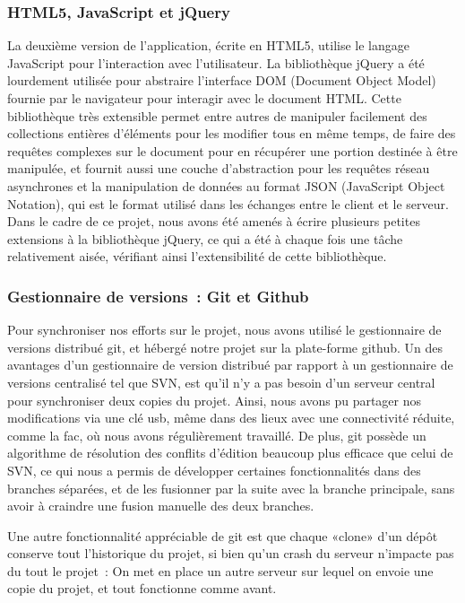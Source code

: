\documentclass[a4paper,11pt,french]{article}
\begin{document}
\subsubsection{HTML5, JavaScript et jQuery}

La deuxième version de l'application, écrite en HTML5, utilise le langage JavaScript pour l'interaction avec l'utilisateur. La bibliothèque jQuery a été lourdement utilisée pour abstraire l'interface DOM (Document Object Model) fournie par le navigateur pour interagir avec le document HTML. Cette bibliothèque très extensible permet entre autres de manipuler facilement des collections entières d'éléments pour les modifier tous en même temps, de faire des requêtes complexes sur le document pour en récupérer une portion destinée à être manipulée, et
fournit aussi une couche d'abstraction pour les requêtes réseau asynchrones et la manipulation de données au format JSON (JavaScript Object Notation), qui est le format utilisé dans les échanges entre le client et le serveur. Dans le cadre de ce projet, nous avons été amenés à écrire plusieurs petites extensions à la bibliothèque jQuery, ce qui a été à chaque fois une tâche relativement aisée, vérifiant ainsi l'extensibilité de cette bibliothèque.

\subsubsection{Gestionnaire de versions~: Git et Github}

Pour synchroniser nos efforts sur le projet, nous avons utilisé le gestionnaire de versions distribué git, et hébergé notre projet sur la plate-forme github. Un des avantages d'un gestionnaire de version distribué par rapport à un gestionnaire de versions centralisé tel que SVN, est qu'il n'y a pas besoin d'un serveur central pour synchroniser deux copies du projet. Ainsi, nous avons pu partager nos modifications via une clé usb, même dans des lieux avec une connectivité réduite, comme la fac, où nous avons régulièrement travaillé. 
De plus, git possède un algorithme de résolution des conflits d'édition beaucoup plus efficace que celui de SVN, ce qui nous a permis de développer certaines fonctionnalités dans des branches séparées, et de les fusionner par la suite avec la branche principale, sans avoir à craindre une fusion manuelle des deux branches.

Une autre fonctionnalité appréciable de git est que chaque «clone» d'un dépôt conserve tout l'historique du projet, si bien qu'un crash du serveur n'impacte pas du tout le projet~: On met en place un autre serveur sur lequel on envoie une copie du projet, et tout fonctionne comme avant.
\end{document}
